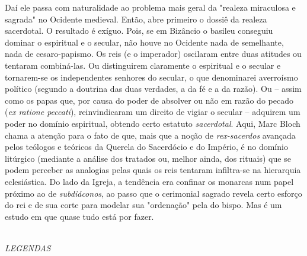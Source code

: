 \documentclass[a5paper]{book}
\begin{document}
Daí ele passa com naturalidade ao problema mais geral da "realeza miraculosa e sagrada" no Ocidente medieval. Então, abre primeiro o dossiê da realeza sacerdotal. O resultado é exíguo. Pois, se em Bizâncio o basileu conseguiu dominar o espiritual e o secular, não houve no Ocidente nada de semelhante, nada de cesaro-papismo. Os reis (e o imperador) oscilaram entre duas atitudes ou tentaram combiná-las. Ou distinguirem claramente o espiritual e o secular e tornarem-se os independentes senhores do secular, o que denominarei averroísmo político (segundo a doutrina das duas verdades, a da fé e a da razão). Ou -- assim como os papas que, por causa do poder de absolver ou não em razão do pecado (\textit{ex ratione peccati}), reinvindicaram um direito de vigiar o secular -- adquirem um poder no domínio espiritual, obtendo certo estatuto \textit{sacerdotal}. Aqui, Marc Bloch chama a atenção para o fato de que, mais que a noção de \textit{rex-sacerdos} avançada pelos teólogos e teóricos da Querela do Sacerdócio e do Império, é no domínio litúrgico (mediante a análise dos tratados ou, melhor ainda, dos rituais) que se podem perceber as analogias pelas quais os reis tentaram inf{\kern0pt}iltra-se na hierarquia eclesiástica. Do lado da Igreja, a tendência era conf{\kern0pt}inar os monarcas num papel próximo ao de \textit{subdiáconos}, ao passo que o cerimonial sagrado revela certo esforço do rei e de sua corte para modelar sua "ordenação" pela do bispo. Mas é um estudo em que quase tudo está por fazer.

~\\ \large \textit{LEGENDAS} ~\\
\end{document}
